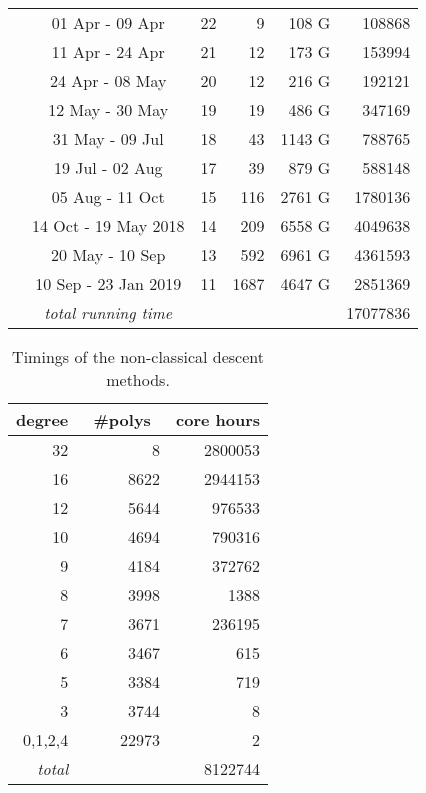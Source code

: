 \documentclass[11pt]{llncs}
\begin{document}
\begin{table}
\begin{center}
\begin{tabular}{ccrrrr}
       & 01 Apr - 09 Apr & 22 & 9 & 108 G & \num{108868} \\
       & 11 Apr - 24 Apr & 21 & 12 & 173 G & \num{153994} \\
       & 24 Apr - 08 May & 20 & 12 & 216 G & \num{192121} \\
       & 12 May - 30 May & 19 & 19 & 486 G & \num{347169} \\
       & 31 May - 09 Jul & 18 & 43 & \num{1143} G & \num{788765} \\
       & 19 Jul - 02 Aug & 17 & 39 & \num{879} G & \num{588148} \\
       & 05 Aug - 11 Oct & 15 & 116 & \num{2761} G & \num{1780136} \\
  & 14 Oct - 19 May 2018 & 14 & 209 & \num{6558} G & \num{4049638} \\
       & 20 May - 10 Sep & 13 & 592 & \num{6961} G & \num{4361593} \\
  & 10 Sep - 23 Jan 2019 & 11 & 1687 & \num{4647} G & \num{2851369} \\\hline
      & \emph{total running time} & & & & \num{17077836}
    \end{tabular}
  \end{center}
\end{table}
      
\begin{table}
  \begin{center}
    \caption{Timings of the non-classical descent methods.}
    \label{tab:clever} \small
    \begin{tabular}{rrr}
       degree & ~\#polys~ & core hours \\\hline
       32 & 8 & \num{2800053} \\
       16 & \num{8622} & \num{2944153} \\
       12 & \num{5644} & \num{976533} \\
       10 & \num{4694} & \num{790316} \\
       9 & \num{4184} & \num{372762} \\
       8 & \num{3998} & \num{1388} \\
       7 & \num{3671} & \num{236195} \\
       6 & \num{3467} & 615 \\
       5 & \num{3384} & 719 \\
       3 & \num{3744} & 8 \\
       0,1,2,4 & \num{22973} & 2 \\\hline
      \emph{total} & & \num{8122744}
    \end{tabular}
  \end{center}
\end{table}
\end{document}
